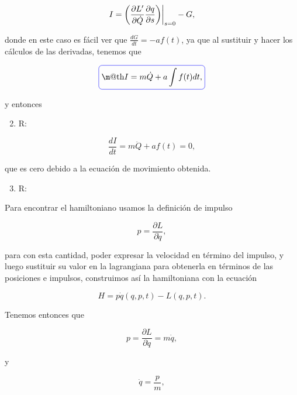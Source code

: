 \documentclass[a4paper,10pt]{article}
\makeatletter
\numberwithin{equation}{section}
\newcommand{\zerodel}{.\kern-\nulldelimiterspace}
\newcommand*{\boxcolor}{blue}
\renewcommand{\boxed}[1]{\textcolor{\boxcolor}{%
\tikz[baseline={([yshift=-1ex]current bounding box.center)}] \node [rectangle, minimum width=1ex,rounded corners,draw] {\normalcolor\m@th$\displaystyle#1$};}}
\makeatother
\begin{document}
\begin{equation}
 I = \left(\left\zerodel\frac{\partial L'}{\partial \dot{Q}}
 \frac{\partial q}{\partial s}\right)\right|_{s=0} - G,
\end{equation}

donde en este caso es fácil ver que $\frac{dG}{dt} = - af(t)$, ya que al sustituir 
y hacer los cálculos de las derivadas, tenemos que 

\begin{equation}
 \boxed{I = m\dot{Q} + a\int f(t) dt,}
\end{equation}

y entonces 

\begin{enumerate}[label=\alph*)]
\setcounter{enumi}{1}
 \item R:
\end{enumerate}

\begin{equation}
 \frac{dI}{dt} = m\ddot{Q} + af(t) = 0,
\end{equation}

que es cero debido a la ecuación de movimiento obtenida.

\begin{enumerate}[label=\alph*)]
\setcounter{enumi}{2}
 \item R:
\end{enumerate}

Para encontrar el hamiltoniano usamos la definición de impulso 

\begin{equation}
 p = \frac{\partial L}{\partial \dot{q}},
\end{equation}

para con esta cantidad, poder expresar la velocidad en término del impulso, y luego 
sustituir su valor en la lagrangiana para obtenerla en términos de las posiciones 
e impulsos, construimos así la hamiltoniana con la ecuación 

\begin{equation}
 H = p\dot{q}(q,p,t) - L(q,p,t).
\end{equation}

Tenemos entonces que 

\begin{equation}
 p = \frac{\partial L}{\partial \dot{q}} = m\dot{q},
\end{equation}

y 

\begin{equation}
 \dot{q} = \frac{p}{m},
\end{equation}
\end{document}
